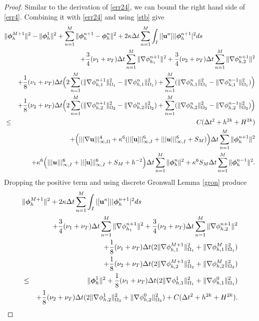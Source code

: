 \documentclass[10pt]{article}%
\numberwithin{equation}{section}
\begin{document}
\begin{proof}
	Similar to the derivation of \eqref{err24}, we can bound the right hand side of \eqref{err4}. Combining it with \eqref{err24} and using \eqref{stb} give	\begin{eqnarray}
	\lefteqn{{\|\boldsymbol{\phi}_{h}^{M+1}\|^2-\|\boldsymbol{\phi}_{h}^{1}\|^2} +\sum_{n=1}^{M}\|\boldsymbol{\phi}_{h}^{n+1}-\boldsymbol{\phi}_{h}^{n}\|^2 +2\kappa\Delta t \sum_{n=1}^{M}\int_{I}|[{\bf u}^n]|  |\boldsymbol{\phi}_{h}^{n+1}|^2ds}
	\nonumber\\&&+{ \frac{3}{4}(\nu_1+\nu_T)\Delta t\sum_{n=1}^{M}\|\nabla  \phi_{h_1}^{n+1}\|^2 +\frac{3}{4}(\nu_2+\nu_T)\Delta t\sum_{n=1}^{M}\|\nabla  \phi_{h,2}^{n+1}\|^2}
	\nonumber\\&&+\frac{1}{8}({{ \nu_1+\nu_T}})\Delta t\Big(2\sum_{n=1}^{M}(\|\nabla{\bf \phi}_{h,1}^{n+1}\|^2_{\Omega_1}-\|\nabla{\bf \phi}_{h,1}^n\|^2_{\Omega_1})+\sum_{n=1}^{M}(\|\nabla{\bf \phi}_{h,1}^{n}\|^2_{\Omega_1}-\|\nabla {\bf \phi}_{h,1}^{n-1}\|^2_{\Omega_1})\Big)\nonumber\\&&+\frac{1}{8}({{ \nu_2+\nu_T}})\Delta t\Big(2\sum_{n=1}^{M}(\|\nabla{\bf \phi}_{h,2}^{n+1}\|^2_{\Omega_2}-\|\nabla{\bf \phi}_{h,2}^n\|^2_{\Omega_2})+\sum_{n=1}^{M}(\|\nabla {\bf \phi}_{h,2}^{n}\|^2_{\Omega_2}-\|\nabla {\bf \phi}_{h,2}^{n-1}\|^2_{\Omega_2})\Big)\nonumber\allowdisplaybreaks\\\allowdisplaybreaks&\leq& C(\Delta t^2+h^{2k}+H^{2k})\nonumber\allowdisplaybreaks\\&&+\Big(|||\nabla {\bf u}|||_{\infty,\Omega}^{4}+\kappa^{ 6}(||[{\bf u}]||^{ 6}_{\infty,I}+|||\boldsymbol{u}|||^{ 6}_{\infty,I}+S_M)\Big)\Delta t\sum_{n=1}^{M}\|\boldsymbol{\phi}_{h}^{n+1}\|^2\nonumber\allowdisplaybreaks\\&&+\kappa^{ 6}\Big(|||\boldsymbol{u}|||^{ 6}_{\infty,I}+||[{\bf u}]||_{\infty,I}^{ 6}+S_M+h^{-2}\Big)\Delta t\sum_{n=1}^M\|\boldsymbol{ \phi}_{h}^n\|^2+\kappa^{6}S_M\Delta t\sum_{n=1}^M\|\boldsymbol{ \phi}_{h}^{n-1}\|^2.\label{err25}
	\end{eqnarray}
 Dropping the positive term and using discrete Gronwall Lemma \ref{gron} produce
	\begin{eqnarray}
	\lefteqn{\|\boldsymbol{\phi}_{h}^{M+1}\|^2  +2\kappa\Delta t \sum_{n=1}^{M}\int_{I}|[{\bf u}^n]|  |\boldsymbol{\phi}_{h}^{n+1}|^2ds}
	\nonumber\\&&+{ \frac{3}{4}(\nu_1+\nu_T)\Delta t\sum_{n=1}^{M}\|\nabla  \phi_{h_1}^{n+1}\|^2 +\frac{3}{4}(\nu_2+\nu_T)\Delta t\sum_{n=1}^{M}\|\nabla  \phi_{h,2}^{n+1}\|^2}
	\nonumber\\&&+\frac{1}{8}({{ \nu_1+\nu_T}})\Delta t(2\|\nabla{\bf \phi}_{h,1}^{M+1}\|^2_{\Omega_1}+\|\nabla{\bf \phi}_{h,1}^{M}\|^2_{\Omega_1})\nonumber\\&&+\frac{1}{8}({{ \nu_2+\nu_T}})\Delta t(2\|\nabla{\bf \phi}_{h,2}^{M+1}\|^2_{\Omega_2}+\|\nabla {\bf \phi}_{h,2}^{M}\|^2_{\Omega_2})\nonumber\\&\leq& \|\boldsymbol{\phi}_{h}^{1}\|^2+\frac{1}{8}({{ \nu_1+\nu_T}})\Delta t(2\|\nabla{\bf \phi}_{h,1}^1\|^2_{\Omega_1}+\|\nabla {\bf \phi}_{h,1}^{0}\|^2_{\Omega_1})\nonumber\\&&+\frac{1}{8}({{ \nu_2+\nu_T}})\Delta t(2\|\nabla{\bf \phi}_{h,2}^1\|^2_{\Omega_2}+\|\nabla {\bf \phi}_{h,2}^{0}\|^2_{\Omega_2})+C(\Delta t^2+h^{2k}+H^{2k}).

\end{eqnarray}
\end{proof}
\end{document}
